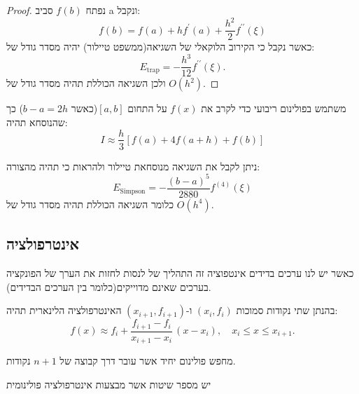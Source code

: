 \documentclass{tstextbook}
\begin{document}
\begin{proof}
נפתח \(f(b)\) סביב a ונקבל:
$$f(b)=f(a)+h f^{\prime}(a)+{\frac{h^{2}}{2}}f^{\prime\prime}(\xi)$$
כאשר נקבל כי הקירוב הלוקאלי של השגיאה(ממשפט טיילור) יהיה מסדר גודל של:
$$E_{\mathrm{trap}}=-{\frac{h^{3}}{12}}f^{\prime\prime}(\xi).$$
ולכן השגיאה הכוללת תהיה מסדר גודל של \(O(h^{2})\).

\end{proof}
\begin{proposition}
משתמש בפולינום ריבועי כדי לקרב את \(f(x)\) על התחום \([a,b]\)(כאשר \(b-a=2h\)) כך שהנוסחא תהיה:
$$I\approx\frac{h}{3}\left[f(a)+4f(a+h)+f(b)\right]$$

\end{proposition}
\begin{corollary}
ניתן לקבל את השגיאה מנוסחאת טיילור ולהראות כי תהיה מהצורה:
$$E_{\mathrm{Simpson}}=-\frac{(b-a)^{5}}{2880}f^{(4)}(\xi)$$
כלומר השגיאה הכוללת תהיה מסדר גודל של \(O(h^{4})\).

\end{corollary}
\subsection{אינטרפולציה}

\begin{definition}[אינטרפולציה]
כאשר יש לנו ערכים בדידים אינטפוציה זה התהליך של לנסות לחזות את הערך של הפונקציה בערכים שאינם מדוייקים(כלומר בין הערכים הבדידים).

\end{definition}
\begin{definition}
בהנתן שתי נקודות סמוכות \((x_{i},f_{i})\) ו-\((x_{i+1},f_{i+1})\) האינטרפולציה הלינארית תהיה:
$$f(x)\approx f_{i}+{\frac{f_{i+1}-f_{i}}{x_{i+1}-x_{i}}}\,(x-x_{i}),\quad x_{i}\leq x\leq x_{i+1}.$$

\end{definition}
\begin{definition}
מחפש פולינום יחיד אשר עובר דרך קבוצה של \(n+1\) נקודות.

\end{definition}
יש מספר שיטות אשר מבצעות אינטרפולציה פולינומית
\end{document}
